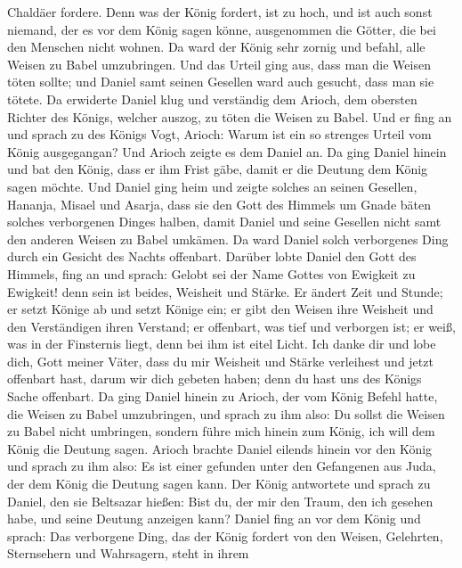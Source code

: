 Chaldäer fordere.  Denn was der König fordert, ist zu hoch,
und ist auch sonst niemand, der es vor dem König sagen könne,
ausgenommen die Götter, die bei den Menschen nicht wohnen. 
Da ward der König sehr zornig und befahl, alle Weisen zu Babel
umzubringen.  Und das Urteil ging aus, dass man die Weisen
töten sollte; und Daniel samt seinen Gesellen ward auch gesucht, dass
man sie tötete.  Da erwiderte Daniel klug und verständig
dem Arioch, dem obersten Richter des Königs, welcher auszog, zu töten
die Weisen zu Babel.  Und er fing an und sprach zu des
Königs Vogt, Arioch: Warum ist ein so strenges Urteil vom König
ausgegangan? Und Arioch zeigte es dem Daniel an.  Da ging
Daniel hinein und bat den König, dass er ihm Frist gäbe, damit er die
Deutung dem König sagen möchte.  Und Daniel ging heim und
zeigte solches an seinen Gesellen, Hananja, Misael und Asarja,
 dass sie den Gott des Himmels um Gnade bäten solches
verborgenen Dinges halben, damit Daniel und seine Gesellen nicht samt
den anderen Weisen zu Babel umkämen.  Da ward Daniel solch
verborgenes Ding durch ein Gesicht des Nachts offenbart. 
Darüber lobte Daniel den Gott des Himmels, fing an und sprach: Gelobt
sei der Name Gottes von Ewigkeit zu Ewigkeit! denn sein ist beides,
Weisheit und Stärke.  Er ändert Zeit und Stunde; er setzt
Könige ab und setzt Könige ein; er gibt den Weisen ihre Weisheit und den
Verständigen ihren Verstand;  er offenbart, was tief und
verborgen ist; er weiß, was in der Finsternis liegt, denn bei ihm ist
eitel Licht.  Ich danke dir und lobe dich, Gott meiner
Väter, dass du mir Weisheit und Stärke verleihest und jetzt offenbart
hast, darum wir dich gebeten haben; denn du hast uns des Königs Sache
offenbart.  Da ging Daniel hinein zu Arioch, der vom König
Befehl hatte, die Weisen zu Babel umzubringen, und sprach zu ihm also:
Du sollst die Weisen zu Babel nicht umbringen, sondern führe mich hinein
zum König, ich will dem König die Deutung sagen.  Arioch
brachte Daniel eilends hinein vor den König und sprach zu ihm also: Es
ist einer gefunden unter den Gefangenen aus Juda, der dem König die
Deutung sagen kann.  Der König antwortete und sprach zu
Daniel, den sie Beltsazar hießen: Bist du, der mir den Traum, den ich
gesehen habe, und seine Deutung anzeigen kann?  Daniel fing
an vor dem König und sprach: Das verborgene Ding, das der König fordert
von den Weisen, Gelehrten, Sternsehern und Wahrsagern, steht in ihrem
